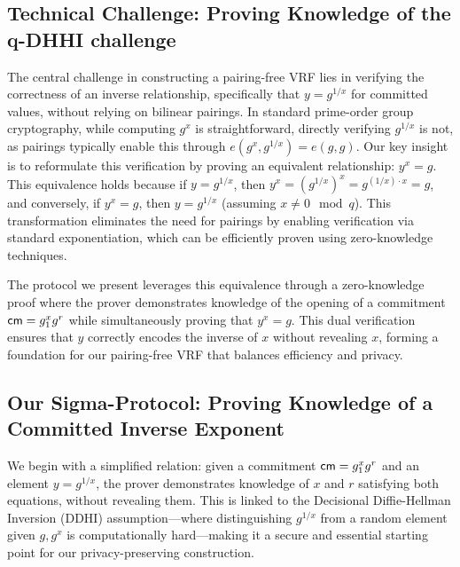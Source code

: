 \subsection{Technical Challenge: Proving Knowledge of the q-DHHI challenge}

The central challenge in constructing a pairing-free VRF lies in verifying the correctness of an inverse relationship, specifically that $y = g^{1/x}$ for committed values, without relying on bilinear pairings. In standard prime-order group cryptography, while computing $g^x$ is straightforward, directly verifying $g^{1/x}$ is not, as pairings typically enable this through $e(g^x, g^{1/x}) = e(g,g)$. Our key insight is to reformulate this verification by proving an equivalent relationship: $y^x = g$. This equivalence holds because if $y = g^{1/x}$, then $y^x = (g^{1/x})^x = g^{(1/x) \cdot x} = g$, and conversely, if $y^x = g$, then $y = g^{1/x}$ (assuming $x \neq 0 \mod q$). This transformation eliminates the need for pairings by enabling verification via standard exponentiation, which can be efficiently proven using zero-knowledge techniques.

The protocol we present leverages this equivalence through a zero-knowledge proof where the prover demonstrates knowledge of the opening of a commitment $\mathsf{cm} = g_1^x g^r$ while simultaneously proving that $y^x = g$. This dual verification ensures that $y$ correctly encodes the inverse of $x$ without revealing $x$, forming a foundation for our pairing-free VRF that balances efficiency and privacy.

\subsection{Our Sigma-Protocol: Proving Knowledge of a Committed Inverse Exponent}

We begin with a simplified relation: given a commitment $\mathsf{cm} = g_1^x g^r$ and an element $y = g^{1/x}$, the prover demonstrates knowledge of $x$ and $r$ satisfying both equations, without revealing them. This is linked to the Decisional Diffie-Hellman Inversion (DDHI) assumption—where distinguishing $g^{1/x}$ from a random element given $g, g^x$ is computationally hard—making it a secure and essential starting point for our privacy-preserving construction.



